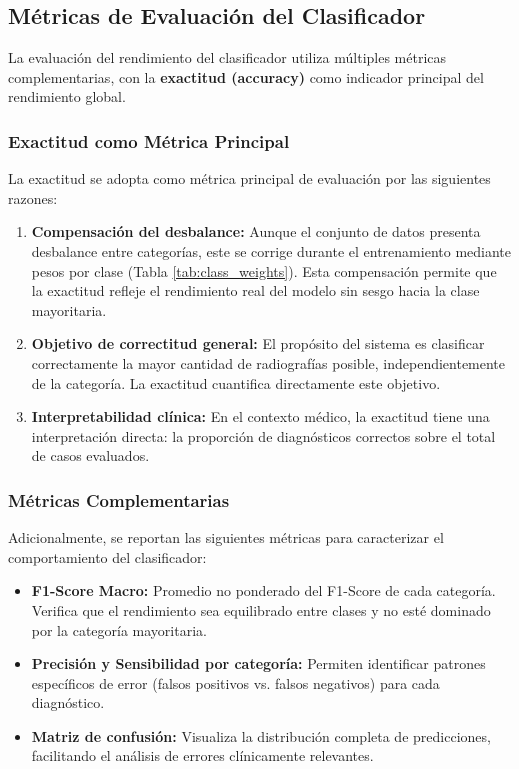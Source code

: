 \subsection{Métricas de Evaluación del Clasificador}
\label{subsec:metricas_evaluacion_clasificador}

La evaluación del rendimiento del clasificador utiliza múltiples métricas complementarias, con la \textbf{exactitud (accuracy)} como indicador principal del rendimiento global.

\subsubsection{Exactitud como Métrica Principal}

La exactitud se adopta como métrica principal de evaluación por las siguientes razones:

\begin{enumerate}
    \item \textbf{Compensación del desbalance:} Aunque el conjunto de datos presenta desbalance entre categorías, este se corrige durante el entrenamiento mediante pesos por clase (Tabla \ref{tab:class_weights}). Esta compensación permite que la exactitud refleje el rendimiento real del modelo sin sesgo hacia la clase mayoritaria.

    \item \textbf{Objetivo de correctitud general:} El propósito del sistema es clasificar correctamente la mayor cantidad de radiografías posible, independientemente de la categoría. La exactitud cuantifica directamente este objetivo.

    \item \textbf{Interpretabilidad clínica:} En el contexto médico, la exactitud tiene una interpretación directa: la proporción de diagnósticos correctos sobre el total de casos evaluados.
\end{enumerate}

\subsubsection{Métricas Complementarias}

Adicionalmente, se reportan las siguientes métricas para caracterizar el comportamiento del clasificador:

\begin{itemize}
    \item \textbf{F1-Score Macro:} Promedio no ponderado del F1-Score de cada categoría. Verifica que el rendimiento sea equilibrado entre clases y no esté dominado por la categoría mayoritaria.

    \item \textbf{Precisión y Sensibilidad por categoría:} Permiten identificar patrones específicos de error (falsos positivos vs. falsos negativos) para cada diagnóstico.

    \item \textbf{Matriz de confusión:} Visualiza la distribución completa de predicciones, facilitando el análisis de errores clínicamente relevantes.
\end{itemize}

